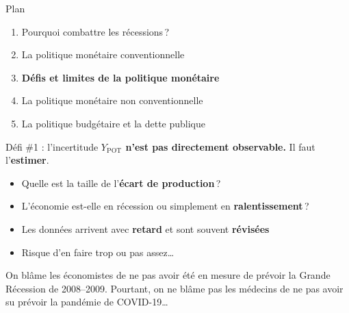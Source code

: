 \documentclass[aspectratio=169]{beamer}
\begin{document}
\begin{frame}{Plan}
   \begin{enumerate}
      \setlength\itemsep{0.5cm}
      \item {\color{gray!50}Pourquoi combattre les récessions\,?}
      \item {\color{gray!50}La politique monétaire conventionnelle}
      \item \textbf{Défis et limites de la politique monétaire}
      \item La politique monétaire non conventionnelle
      \item La politique budgétaire et la dette publique
   \end{enumerate}
\end{frame}


\begin{frame}[t]{Défi \#1 : l'incertitude}\examtag
   \small
   \vspace{0.2cm}
   \textbf{$Y_{\text{POT}}$ n'est pas directement observable.} Il faut l'\textbf{estimer}.
   \vspace{0.15cm}
   \begin{itemize}
      \setlength\itemsep{0.15cm}
      \item Quelle est la taille de l'\textbf{écart de production}\,?
      \item L'économie est-elle en récession ou simplement en \textbf{ralentissement}\,?
      \item Les données arrivent avec \textbf{retard} et sont souvent \textbf{révisées}
      \item Risque d'en faire trop ou pas assez\ldots
   \end{itemize}
   \vspace{0.1cm}
   \begin{warning}[Analogie]
      On blâme les économistes de ne pas avoir été en mesure de prévoir la Grande Récession de 2008--2009. Pourtant, on ne blâme pas les médecins de ne pas avoir su prévoir la pandémie de COVID-19\ldots
   \end{warning}
\end{frame}
\end{document}

